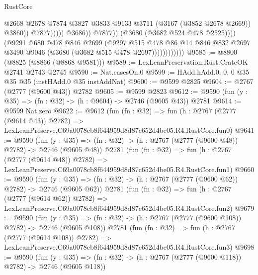 \begin{lexlean}{RustCore}
\begin{coremodule}
                                              @2668
                                              @2678
                                              @7874
                                              @3827
                                              @3833
                                              @9133
                                              @3711
                                              (@3167 (@3852 @2678 @2669))
                                              @3860))
                                          @7877)))))
                                @3686))
                            @7877))
                        (@3680 (@3682 @524 @478 @2525))))
                    (@9291
                      @680
                      @478
                      @846
                      @2699
                      (@9297
                        @515
                        @478
                        @86
                        @14
                        @846
                        @832
                        @2697
                        @3490
                        @9046
                        (@3680 (@3682 @515 @478 @2697))))))))))))
@9585 := @8800 (@8825 (@8866 (@8868 @9581)))
@9589 := LexLeanPreservation.Rust.CrateOK @2741 @2743 @2745
@9590 := Nat.casesOn.{0}
@9599 := HAdd.hAdd.{0, 0, 0} @35 @35 @35 (instHAdd.{0} @35 instAddNat)
@9600 := @9599 @2825
@9604 := @2767 (@2777 (@9600 @43)) @2782
@9605 := @9599 @2823
@9612 := @9590 (fun (y : @35) => (fn : @32) -> (h : @9604) -> @2746 (@9605 @43)) @2781
@9614 := @9599 Nat.zero
@9622 := @9612
    (fun (fn : @32) =>
    fun (h : @2767 (@2777 (@9614 @43)) @2782) =>
    LexLeanPreserve.C69a0078cb8f644959d8d87c652d4be05.R4.RustCore.fun0)
@9641 := @9590
    (fun (y : @35) => (fn : @32) -> (h : @2767 (@2777 (@9600 @48)) @2782) -> @2746 (@9605 @48))
    @2781
    (fun (fn : @32) =>
    fun (h : @2767 (@2777 (@9614 @48)) @2782) =>
    LexLeanPreserve.C69a0078cb8f644959d8d87c652d4be05.R4.RustCore.fun1)
@9660 := @9590
    (fun (y : @35) => (fn : @32) -> (h : @2767 (@2777 (@9600 @62)) @2782) -> @2746 (@9605 @62))
    @2781
    (fun (fn : @32) =>
    fun (h : @2767 (@2777 (@9614 @62)) @2782) =>
    LexLeanPreserve.C69a0078cb8f644959d8d87c652d4be05.R4.RustCore.fun2)
@9679 := @9590
    (fun (y : @35) => (fn : @32) -> (h : @2767 (@2777 (@9600 @108)) @2782) -> @2746 (@9605 @108))
    @2781
    (fun (fn : @32) =>
    fun (h : @2767 (@2777 (@9614 @108)) @2782) =>
    LexLeanPreserve.C69a0078cb8f644959d8d87c652d4be05.R4.RustCore.fun3)
@9698 := @9590
    (fun (y : @35) => (fn : @32) -> (h : @2767 (@2777 (@9600 @118)) @2782) -> @2746 (@9605 @118))

\end{coremodule}
\end{lexlean}
